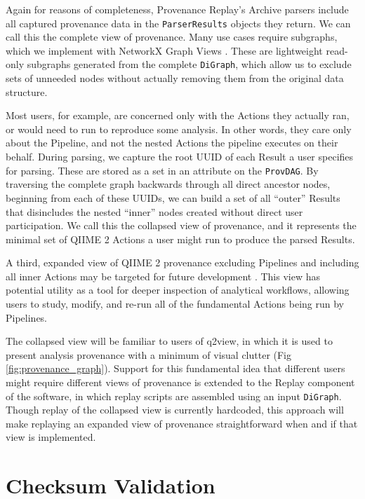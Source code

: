 Again for reasons of completeness, Provenance Replay’s Archive parsers include
all captured provenance data in the \texttt{ParserResults} objects they return. We can
call this the complete view of provenance. Many use cases require subgraphs,
which we implement with NetworkX Graph Views \parencite{hagberg_exploring_2008}.
These are lightweight read-only subgraphs generated from the complete \texttt{DiGraph},
which allow us to exclude sets of unneeded nodes without actually removing them
from the original data structure.

Most users, for example, are concerned only with the Actions they actually ran,
or would need to run to reproduce some analysis. In other words, they care only
about the Pipeline, and not the nested Actions the pipeline executes on their
behalf. During parsing, we capture the root UUID of each Result a user specifies
for parsing. These are stored as a set in an attribute on the \texttt{ProvDAG}. By
traversing the complete graph backwards through all direct ancestor nodes,
beginning from each of these UUIDs, we can build a set of all “outer” Results
that disincludes the nested “inner” nodes created without direct user
participation. We call this the collapsed view of provenance, and it represents
the minimal set of QIIME 2 Actions a user might run to produce the parsed
Results.

A third, expanded view of QIIME 2 provenance excluding Pipelines and including
all inner Actions may be targeted for future development \parencite[Issue #74]{keefe_issues_2021}.
This view has potential utility as a tool for deeper inspection of analytical
workflows, allowing users to study, modify, and re-run all of the fundamental
Actions being run by Pipelines. 

The collapsed view will be familiar to users of q2view, in which it is used to
present analysis provenance with a minimum of visual clutter (Fig \ref{fig:provenance_graph}).
Support for this fundamental idea that different users might require different
views of provenance is extended to the Replay component of the software, in
which replay scripts are assembled using an input \texttt{DiGraph}. Though replay of the
collapsed view is currently hardcoded, this approach will make replaying an
expanded view of provenance straightforward when and if that view is
implemented.


\section{Checksum Validation}

